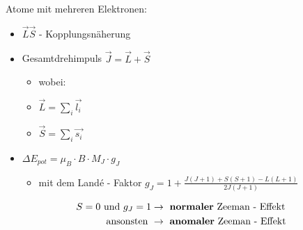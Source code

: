         \begin{myframe}{\subsecname}
            Atome mit mehreren Elektronen:
            \begin{itemize}
                \item $\vec{L} \vec{S}$ - Kopplungsnäherung
                \item Gesamtdrehimpuls $\vec{J} = \vec{L} + \vec{S}$
                \begin{itemize}
                    \item[] wobei:
                    \item $\vec{L} = \sum_i \vec{l_i}$
                    \item $\vec{S} = \sum_i \vec{s_i}$
                \end{itemize}
                \item $\Delta E_{pot} = \mu_B \cdot B \cdot M_J \cdot g_J $
                \begin{itemize}
                    \item mit dem Landé - Faktor $g_{J} = 1 + \frac{J(J + 1) + S(S + 1) - L(L + 1)}{2J(J + 1)}$
                \end{itemize}
            \end{itemize}
            \begin{align*}
              S = 0 \text{ und } g_{J} = 1 &\rightarrow \text{ \textbf{normaler} Zeeman - Effekt} \\
              \text{ ansonsten } &\rightarrow \text{ \textbf{anomaler} Zeeman - Effekt}
            \end{align*}
        \end{myframe}



